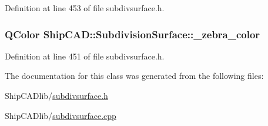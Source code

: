 Definition at line 453 of file subdivsurface.\+h.

\subsubsection[{\texorpdfstring{\+\_\+zebra\+\_\+color}{_zebra_color}}]{\setlength{\rightskip}{0pt plus 5cm}Q\+Color Ship\+C\+A\+D\+::\+Subdivision\+Surface\+::\+\_\+zebra\+\_\+color\hspace{0.3cm}{\ttfamily [protected]}}\hypertarget{classShipCAD_1_1SubdivisionSurface_a047d5d0575c944d216ada589e30ee3bd}{}\label{classShipCAD_1_1SubdivisionSurface_a047d5d0575c944d216ada589e30ee3bd}


Definition at line 451 of file subdivsurface.\+h.



The documentation for this class was generated from the following files\+:\begin{DoxyCompactItemize}
\item 
Ship\+C\+A\+Dlib/\hyperlink{subdivsurface_8h}{subdivsurface.\+h}\item 
Ship\+C\+A\+Dlib/\hyperlink{subdivsurface_8cpp}{subdivsurface.\+cpp}\end{DoxyCompactItemize}

